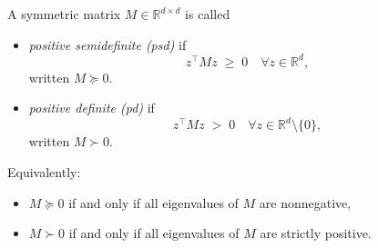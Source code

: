 \begin{remark}
A symmetric matrix $M \in \mathbb{R}^{d\times d}$ is called
\begin{itemize}
  \item \emph{positive semidefinite (psd)} if
  \[
  z^\top M z \;\geq\; 0 \quad \forall z \in \mathbb{R}^d,
  \]
  written $M \succeq 0$.
  \item \emph{positive definite (pd)} if
  \[
  z^\top M z \;>\; 0 \quad \forall z \in \mathbb{R}^d\setminus\{0\},
  \]
  written $M \succ 0$.
\end{itemize}
Equivalently:
\begin{itemize}
  \item $M\succeq 0$ if and only if all eigenvalues of $M$ are nonnegative,
  \item $M\succ 0$ if and only if all eigenvalues of $M$ are strictly positive.
\end{itemize}
\end{remark}